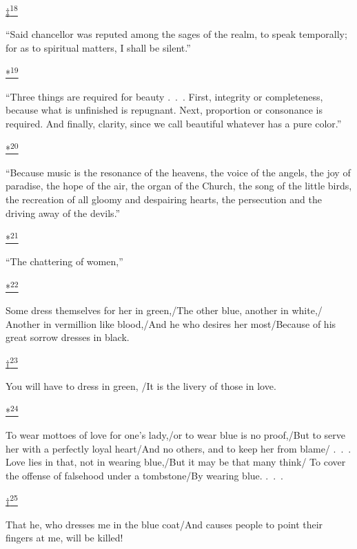 \protect\hypertarget{23_NOTES.xhtmlux5cux23id_2688}{\protect\hyperlink{20_ILLUSTRATIONS_FOLLOW_PAGE.xhtmlux5cux23id_2687}{‡\textsuperscript{18}}}
``Said chancellor was reputed among the sages of the realm, to speak
temporally; for as to spiritual matters, I shall be silent.''

\protect\hypertarget{23_NOTES.xhtmlux5cux23id_2352}{\protect\hyperlink{20_ILLUSTRATIONS_FOLLOW_PAGE.xhtmlux5cux23id_2351}{*\textsuperscript{19}}}
``Three things are required for beauty .~.~. First, integrity or
completeness, because what is unfinished is repugnant. Next, proportion
or consonance is required. And finally, clarity, since we call beautiful
whatever has a pure color.''

\protect\hypertarget{23_NOTES.xhtmlux5cux23id_2689}{\protect\hyperlink{20_ILLUSTRATIONS_FOLLOW_PAGE.xhtmlux5cux23id_2690}{*\textsuperscript{20}}}
``Because music is the resonance of the heavens, the voice of the
angels, the joy of paradise, the hope of the air, the organ of the
Church, the song of the little birds, the recreation of all gloomy and
despairing hearts, the persecution and the driving away of the devils.''

\protect\hypertarget{23_NOTES.xhtmlux5cux23id_2692}{\protect\hyperlink{20_ILLUSTRATIONS_FOLLOW_PAGE.xhtmlux5cux23id_2691}{*\textsuperscript{21}}}
``The chattering of women,''

\protect\hypertarget{23_NOTES.xhtmlux5cux23id_2694}{\protect\hyperlink{20_ILLUSTRATIONS_FOLLOW_PAGE.xhtmlux5cux23id_2693}{*\textsuperscript{22}}}
Some dress themselves for her in green,/The other blue, another in
white,/ Another in vermillion like blood,/And he who desires her
most/Because of his great sorrow dresses in black.

\protect\hypertarget{23_NOTES.xhtmlux5cux23id_2696}{\protect\hyperlink{20_ILLUSTRATIONS_FOLLOW_PAGE.xhtmlux5cux23id_2695}{†\textsuperscript{23}}}
You will have to dress in green, /It is the livery of those in love.

\protect\hypertarget{23_NOTES.xhtmlux5cux23id_2698}{\protect\hyperlink{20_ILLUSTRATIONS_FOLLOW_PAGE.xhtmlux5cux23id_2697}{*\textsuperscript{24}}}
To wear mottoes of love for one's lady,/or to wear blue is no proof,/But
to serve her with a perfectly loyal heart/And no others, and to keep her
from blame/ .~.~. Love lies in that, not in wearing blue,/But it may be
that many think/ To cover the offense of falsehood under a tombstone/By
wearing blue. .~.~.

\protect\hypertarget{23_NOTES.xhtmlux5cux23id_2700}{\protect\hyperlink{20_ILLUSTRATIONS_FOLLOW_PAGE.xhtmlux5cux23id_2699}{†\textsuperscript{25}}}
That he, who dresses me in the blue coat/And causes people to point
their fingers at me, will be killed!

